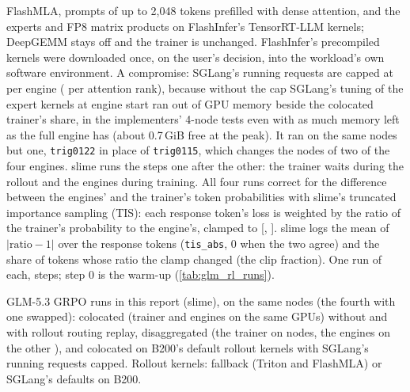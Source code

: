 FlashMLA, prompts of up to 2,048 tokens prefilled with dense attention, and the experts and FP8 matrix products on FlashInfer's TensorRT-LLM kernels; DeepGEMM stays off and the trainer is unchanged. FlashInfer's precompiled kernels were downloaded once, on the user's decision, into the workload's own software environment. A compromise: SGLang's running requests are capped at \TriGrKnCap{} per engine (\TriGrKnCapRank{} per attention rank), because without the cap SGLang's tuning of the expert kernels at engine start ran out of GPU memory beside the colocated trainer's share, in the implementers' 4-node tests even with as much memory left as the full engine has (about 0.7\,GiB free at the peak). It ran on the same nodes but one, \texttt{trig0122} in place of \texttt{trig0115}, which changes the nodes of two of the four engines. slime runs the steps one after the other: the trainer waits during the rollout and the engines during training. All four runs correct for the difference between the engines' and the trainer's token probabilities with slime's truncated importance sampling (TIS): each response token's loss is weighted by the ratio of the trainer's probability to the engine's, clamped to [\TriGrTisClipLow, \TriGrTisClipHigh]. slime logs the mean of $|\text{ratio}-1|$ over the response tokens (\texttt{tis\_abs}, 0 when the two agree) and the share of tokens whose ratio the clamp changed (the clip fraction). One run of each, \TriGrSteps{} steps; step 0 is the warm-up (\cref{tab:glm_rl_runs}).

\begin{table}[h]
  \caption{GLM-5.3 GRPO runs in this report (slime), on the same nodes (the fourth with one swapped): colocated (trainer and engines on the same \TriGrGpus{} GPUs) without and with rollout routing replay, disaggregated (the trainer on \TriGrDgTrainerNodes{} nodes, the engines on the other \TriGrDgEngineNodes), and colocated on B200's default rollout kernels with SGLang's running requests capped. Rollout kernels: fallback (Triton and FlashMLA) or SGLang's defaults on B200.}
  \label{tab:glm_rl_runs}
  \centering\small
  \begin{adjustbox}{max width=\linewidth}
  \end{adjustbox}
\end{table}

